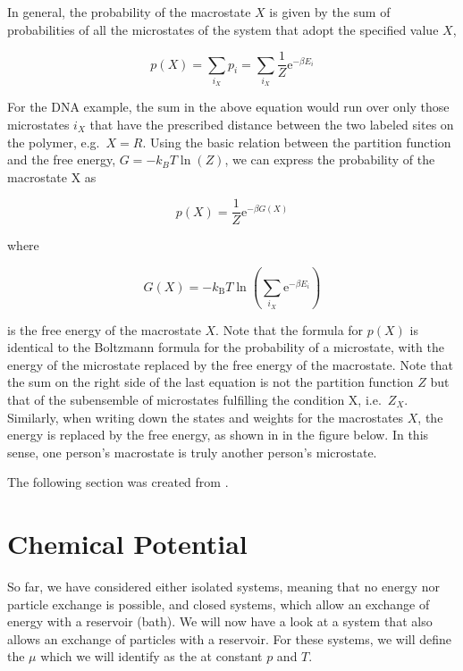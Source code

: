 \documentclass[letterpaper,10pt,english]{sphinxmanual}
\let\sphinxpxdimen\pdfpxdimen\else\newdimen\sphinxpxdimen
\begin{document}
\sphinxAtStartPar
In general, the probability of the macrostate \(X\) is given by the sum of probabilities of all the microstates of the system that adopt the specified value \(X\),

\sphinxAtStartPar
\begin{equation}
p(X)=\sum_{i_{X}} p_{i}=\sum_{i_{X}} \frac{1}{Z} \mathrm{e}^{-\beta E_{i}}
\end{equation}

\sphinxAtStartPar
For the DNA example, the sum in the above equation would run over only those microstates \(i_X\) that have the prescribed distance between the two labeled sites on the polymer, e.g. \(X=R\). Using the basic relation between the partition function and the free energy, \(G = −k_BT \ln(Z)\), we can express the probability of the macrostate X as

\sphinxAtStartPar
\begin{equation}
p(X)=\frac{1}{Z} \mathrm{e}^{-\beta G(X)}
\end{equation}

\sphinxAtStartPar
where

\sphinxAtStartPar
\begin{equation}
G(X)=-k_{\mathrm{B}} T \ln \left(\sum_{i_{X}} \mathrm{e}^{-\beta E_{i}}\right)
\end{equation}

\sphinxAtStartPar
is the free energy of the macrostate \(X\). Note that the formula for \(p(X)\) is identical to the Boltzmann formula for the probability of a microstate, with the energy of the microstate replaced by the free energy of the macrostate. Note that the sum on the right side of the last equation is not the partition function \(Z\) but that of the subensemble of microstates fulfilling the condition X, i.e. \(Z_X\). Similarly, when writing down the states and weights for the macrostates
\(X\), the energy is replaced by the free energy, as shown in in the figure below. In this sense, one person’s macrostate is truly another person’s microstate.

\noindent\sphinxincludegraphics[width=500\sphinxpxdimen,height=252\sphinxpxdimen]{{micro_macro}.png}



\sphinxAtStartPar
The following section was created from .


\chapter{Chemical Potential}
\label{\detokenize{notebooks/L3/2_Chemical_Potential:Chemical-Potential}}\label{\detokenize{notebooks/L3/2_Chemical_Potential::doc}}
\sphinxAtStartPar
So far, we have considered either isolated systems, meaning that no energy nor particle exchange is possible, and closed systems, which allow an exchange of energy with a reservoir (bath). We will now have a look at a system that also allows an exchange of particles with a reservoir. For these systems, we will define the  \(\mu\) which we will identify as the  at constant
\(p\) and \(T\).
\end{document}
